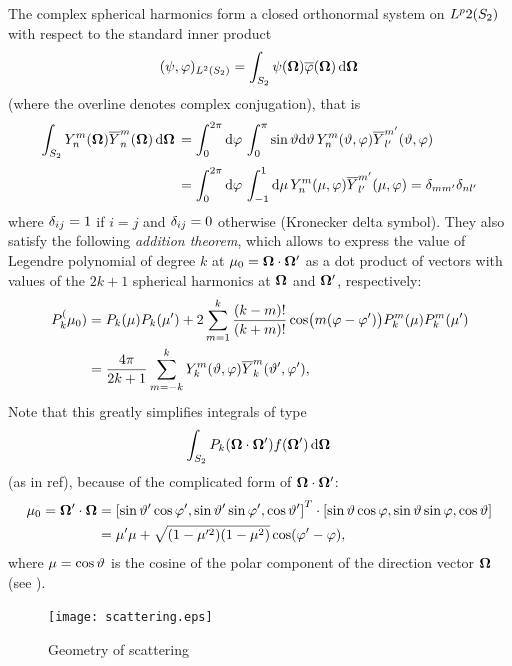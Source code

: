 The complex spherical harmonics form a closed orthonormal system on $\Lp{2}(\Sphere)$ with respect to the
standard inner product $$
(\psi, \varphi)_{\Lp[2](\Sphere)} = \intA{\psi(\bomega) {\overline\varphi(\bomega)}}
$$
(where the overline denotes complex conjugation), that is
$$
\begin{aligned}
\intA{\Y{n}{m}(\bomega)\Yc{n}{m}(\bomega)} &=
\int_{0}^{2\pi}\d{\azimuthal}\int_{0}^{\pi}\sin\polar\d{\polar}  
\Y{n}{m}(\polar,\azimuthal)\Yc{l'}{m'}(\polar,\azimuthal)\\[.25em]
& = \int_{0}^{2\pi}\d{\azimuthal}\int_{-1}^{1}\d{\mu}
\Y{n}{m}(\mu,\azimuthal)\Yc{l'}{m'}(\mu,\azimuthal) = \kron{m}{m'}\kron{n}{l'}
\end{aligned}
$$
where $\kron{i}{j} = 1$ if $i = j$ and $\kron{i}{j} = 0$ otherwise (Kronecker delta symbol). They also satisfy the
following \textit{addition theorem}, which allows to express the value of Legendre polynomial of degree $k$ at $\mu_0 =
\bomega\cdot\bomega'$ as a dot product of vectors with values of the $2k+1$ spherical harmonics at $\bomega$ and
$\bomega'$, respectively:
\begin{align}
\P{k}(\mu_0)
&=P_k(\mu) P_k(\mu')+2 \sum _{m = 1}^k \frac{(k-m)!}{(k+m)!} \cos \bigl(m(\azimuthal - \azimuthal')\bigr) P_k^m(\mu) P_k^m(\mu')\nonumber\\
&=\frac{4\pi}{2k+1}\suma[m]{-k}{k}\Y{k}{m}(\polar,\azimuthal)\Yc{k}{m}(\polar',\azimuthal'),
\label{eq:additionThm}
\end{align}
Note that this greatly simplifies integrals of type
$$
\intA{P_k(\bomega\cdot\bomega')f(\bomega')}
$$
(as in \alert{ref}), because of the complicated form of $\bomega\cdot\bomega'$:
$$
\begin{aligned}
	\mu_0 = \bomega'\cdot\bomega 
&= \lvect{\sint'\cosp',\sint'\sinp',\cost'} \cdot 
	\lvec{\sint\cosp,\sint\sinp,\cost}\\
& = \mu'\mu + \sqrt{(1-\mu'^2)(1-\mu^2)}\cos(\azimuthal' - \azimuthal),
\end{aligned}
$$
where $\mu = \cost$ is the
 cosine of the polar component of the direction vector $\bomega$ (see ).
\begin{figure}[!hbt]
    \centering
    \texttt{[image: scattering.eps]}
    \caption[Scattering]{Geometry of scattering}
    \label{fig:scatter}
\end{figure}

